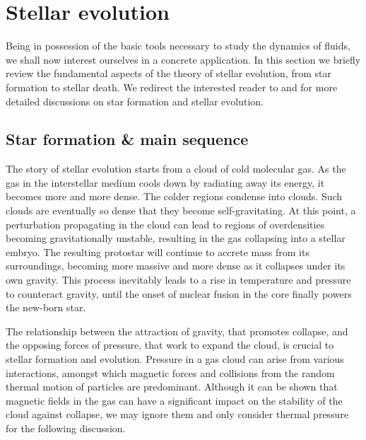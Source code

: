 

\section{Stellar evolution} \label{sec:stellar_evo}

Being in possession of the basic tools necessary to study the dynamics of fluids, we shall now interest ourselves in a concrete application. In this section we briefly review the fundamental aspects of the theory of stellar evolution, from star formation to stellar death. We redirect the interested reader to \cite{Krumholz2017} and \cite{Prialnik2009} for more detailed discussions on star formation and stellar evolution.

\subsection{Star formation \& main sequence} \label{sec:star_formation}

The story of stellar evolution starts from a cloud of cold molecular gas. As the gas in the interstellar medium cools down by radiating away its energy, it becomes more and more dense. The colder regions condense into clouds. Such clouds are eventually so dense that they become self-gravitating. At this point, a perturbation propagating in the cloud can lead to regions of overdensities becoming gravitationally unstable, resulting in the gas collapsing into a stellar embryo. The resulting protostar will continue to accrete mass from its surroundings, becoming more massive and more dense as it collapses under its own gravity. This process inevitably leads to a rise in temperature and pressure to counteract gravity, until the onset of nuclear fusion in the core finally powers the new-born star.

The relationship between the attraction of gravity, that promotes collapse, and the opposing forces of pressure, that work to expand the cloud, is crucial to stellar formation and evolution. Pressure in a gas cloud can arise from various interactions, amongst which magnetic forces and collisions from the random thermal motion of particles are predominant. Although it can be shown that magnetic fields in the gas can have a significant impact on the stability of the cloud against collapse, we may ignore them and only consider thermal pressure for the following discussion.

